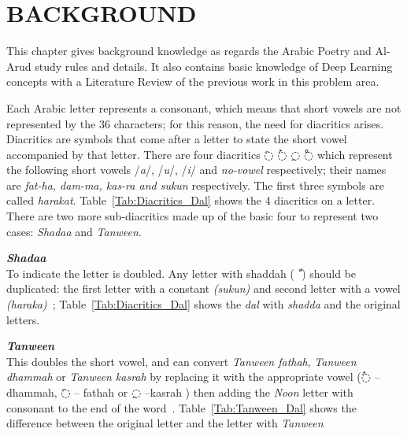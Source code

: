 \chapter{\uppercase{Background}}\label{Ch:Background}
This chapter gives background knowledge as regards the Arabic Poetry and Al-Arud study rules and details. It also contains basic knowledge of Deep Learning concepts with a Literature Review of the previous work in this problem area. 

Each Arabic letter represents a consonant, which means that short vowels are not represented by the 36 characters; for this
reason, the need for diacritics arises. Diacritics are symbols that come after a letter to state the short vowel accompanied by that letter. There are four diacritics \textarabic{◌َ} \textarabic{◌ُ}
\textarabic{◌ِ} \textarabic{◌ْ} which represent the following short vowels /\textit{a}/, /\textit{u}/, /\textit{i}/ and \textit{no-vowel} respectively; their names are \textit{fat-ha, dam-ma, kas-ra and sukun} respectively. The first three symbols are called \textit{harakat}. Table~\ref{Tab:Diacritics_Dal} shows the 4 diacritics on a letter.
There are two more sub-diacritics made up of the basic four to represent two cases: \textit{Shadaa} and \textit{Tanween}.%

\begin{definition}\label{def:shadaa_definition}
  \textbf{\textit{Shadaa}}  \hfill \\
To indicate the letter is doubled. Any letter with shaddah (\textarabic{ ّ }) should be duplicated: the first letter with a constant \textit{(sukun)} and second letter with a vowel \textit{(haraka)}~\cite{Alnagdawi2013FindingArabicPoemMeter}; Table~\ref{Tab:Diacritics_Dal} shows the \textit{dal} with \textit{shadda} and the original letters. %
%
\end{definition}
\begin{definition}\label{def:tanween_definition}
  \textbf{\textit{Tanween}} \hfill \\
  This doubles the short vowel, and can convert \textit{Tanween fathah}, \textit{Tanween dhammah} or \textit{Tanween kasrah} by replacing it with the appropriate vowel (\textarabic{◌ُ} – dhammah, \textarabic{◌َ} – fathah or \textarabic{◌ِ} –kasrah ) then adding the \textit{Noon} letter with consonant to the end of the word~\cite{Alnagdawi2013FindingArabicPoemMeter}. Table~\ref{Tab:Tanween_Dal} shows the difference between the original letter and the letter with \textit{Tanween}
  
\end{definition}%


